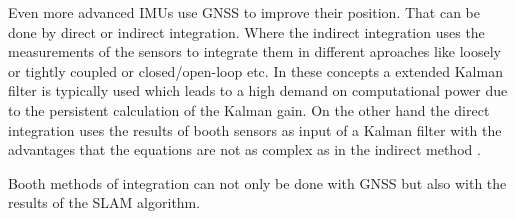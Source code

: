 Even more advanced \ac{IMU}s use \ac{GNSS} to improve their position.
That can be done by direct or indirect integration.
Where the indirect integration uses the measurements of the sensors to integrate them in different aproaches like loosely or tightly coupled or closed/open-loop etc.
In these concepts a extended Kalman filter is typically used which leads to a high demand on computational power due to the persistent calculation of the Kalman gain.
On the other hand the direct integration uses the results of booth sensors as input of a Kalman filter with the advantages that the equations are not as complex as in the indirect method \cite{Qi2002}.

Booth methods of integration can not only be done with \ac{GNSS} but also with the results of the \ac{SLAM} algorithm.

